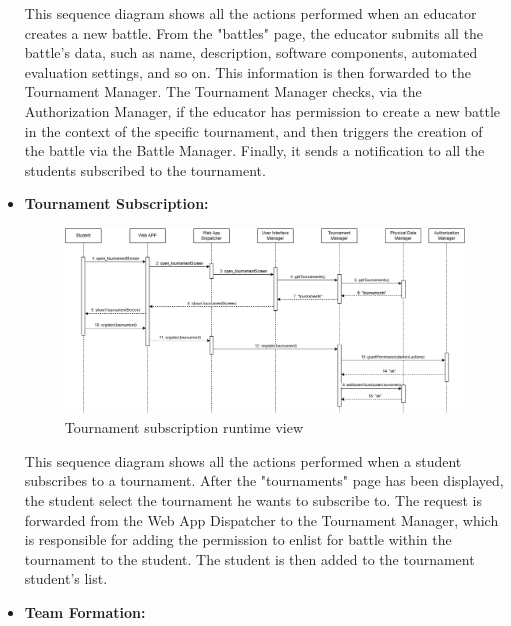 \begin{itemize}
    This sequence diagram shows all the actions performed when an educator creates a new battle. From the "battles" page, the educator submits all the battle's data, such as name, description, software components, automated evaluation settings, and so on. This information is then forwarded to the Tournament Manager. The Tournament Manager checks, via the Authorization Manager, if the educator has permission to create a new battle in the context of the specific tournament, and then triggers the creation of the battle via the Battle Manager. Finally, it sends a notification to all the students subscribed to the tournament.

    \newpage

    \item \textbf{Tournament Subscription:}

    \begin{figure}[H]
        \centering
        \includegraphics[width=1\linewidth]{Images/RV8.png}
        \caption{Tournament subscription runtime view}
        \label{fig:rv8}
    \end{figure}

    This sequence diagram shows all the actions performed when a student subscribes to a tournament. After the "tournaments" page has been displayed, the student select the tournament he wants to subscribe to. The request is forwarded from the Web App Dispatcher to the Tournament Manager, which is responsible for adding the permission to enlist for battle within the tournament to the student. The student is then added to the tournament student's list.

    \newpage

    \item \textbf{Team Formation:}


\end{itemize}
